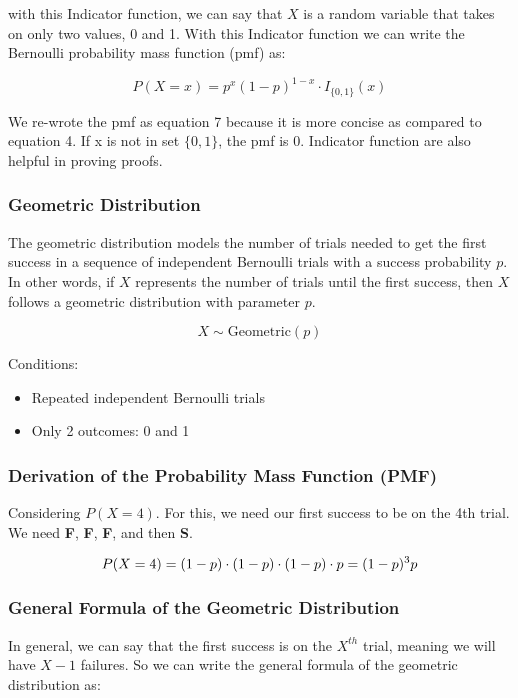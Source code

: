 with this Indicator function, we can say that $X$ is a random variable that takes on only two values, 0 and 1. With this Indicator function we can write the Bernoulli probability mass function (pmf) as:

\begin{equation}
    P(X=x) = p^x(1-p)^{1-x} \cdot I_{\{0,1\}}(x)
\end{equation}

We re-wrote the pmf as equation 7 because it is more concise as compared to equation 4. If x is not in set $\{0,1\}$, the pmf is 0. Indicator function are also helpful in proving proofs.


\subsubsection{Geometric Distribution}

The geometric distribution models the number of trials needed to get the first success in a sequence of independent Bernoulli trials with a success probability \( p \). In other words, if \( X \) represents the number of trials until the first success, then \( X \) follows a geometric distribution with parameter \( p \).

\begin{equation}
    X \sim \text{Geometric}(p)
\end{equation}

Conditions:
\begin{itemize}
    \item Repeated independent Bernoulli trials
    \item Only 2 outcomes: 0 and 1
\end{itemize}

\subsubsection*{Derivation of the Probability Mass Function (PMF)}
Considering $P(X=4)$. For this, we need our first success to be on the 4th trial. We need \textbf{F}, \textbf{F}, \textbf{F}, and then \textbf{S}.

$$
    P(X=4) = (1-p) \cdot (1-p) \cdot (1-p) \cdot p \\
    = (1-p)^3 p
$$


\subsubsection*{General Formula of the Geometric Distribution}
In general, we can say that the first success is on the \( X^{th} \) trial, meaning we will have \( X-1 \) failures. So we can write the general formula of the geometric distribution as:

